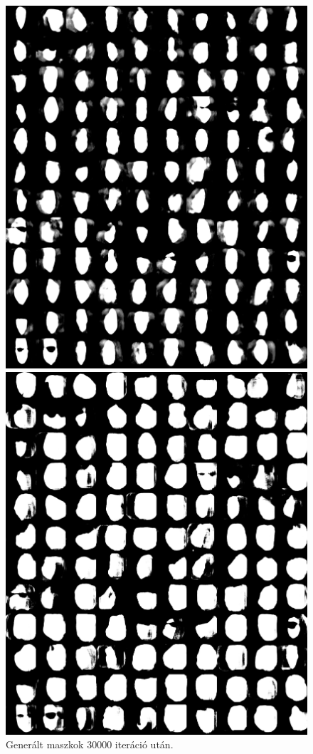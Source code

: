 \documentclass[12pt,a4]{article}
\begin{document}
\begin{figure}[h!]
\begin{minipage}[b]{0.4\textwidth}
            \includegraphics[width=\textwidth]{test-masks-30000.png}
            \caption{Generált maszkok 30000 iteráció után.}
            \label{fig:masks-30000it}
          \end{minipage}
          \begin{minipage}[b]{0.4\textwidth}
            \includegraphics[width=\textwidth]{test-masks-90000.png}

\end{minipage}
\end{figure}
\end{document}
